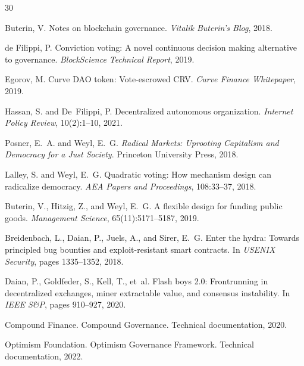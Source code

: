 \documentclass[11pt,a4paper]{article}
\begin{document}
\begin{thebibliography}{30}

Buterin, V.
\newblock Notes on blockchain governance.
\newblock \emph{Vitalik Buterin's Blog}, 2018.

de Filippi, P.
\newblock Conviction voting: A novel continuous decision making alternative to governance.
\newblock \emph{BlockScience Technical Report}, 2019.

Egorov, M.
\newblock Curve {DAO} token: Vote-escrowed {CRV}.
\newblock \emph{Curve Finance Whitepaper}, 2019.

Hassan, S. and De~Filippi, P.
\newblock Decentralized autonomous organization.
\newblock \emph{Internet Policy Review}, 10(2):1--10, 2021.

Posner, E.~A. and Weyl, E.~G.
\newblock \emph{Radical Markets: Uprooting Capitalism and Democracy for a Just Society}.
\newblock Princeton University Press, 2018.

Lalley, S. and Weyl, E.~G.
\newblock Quadratic voting: How mechanism design can radicalize democracy.
\newblock \emph{AEA Papers and Proceedings}, 108:33--37, 2018.

Buterin, V., Hitzig, Z., and Weyl, E.~G.
\newblock A flexible design for funding public goods.
\newblock \emph{Management Science}, 65(11):5171--5187, 2019.

Breidenbach, L., Daian, P., Juels, A., and Sirer, E.~G.
\newblock Enter the hydra: Towards principled bug bounties and exploit-resistant smart contracts.
\newblock In \emph{USENIX Security}, pages 1335--1352, 2018.

Daian, P., Goldfeder, S., Kell, T., et~al.
\newblock Flash boys 2.0: Frontrunning in decentralized exchanges, miner extractable value, and consensus instability.
\newblock In \emph{IEEE S\&P}, pages 910--927, 2020.

Compound Finance.
\newblock Compound Governance.
\newblock Technical documentation, 2020.

Optimism Foundation.
\newblock Optimism Governance Framework.
\newblock Technical documentation, 2022.


\end{thebibliography}
\end{document}
